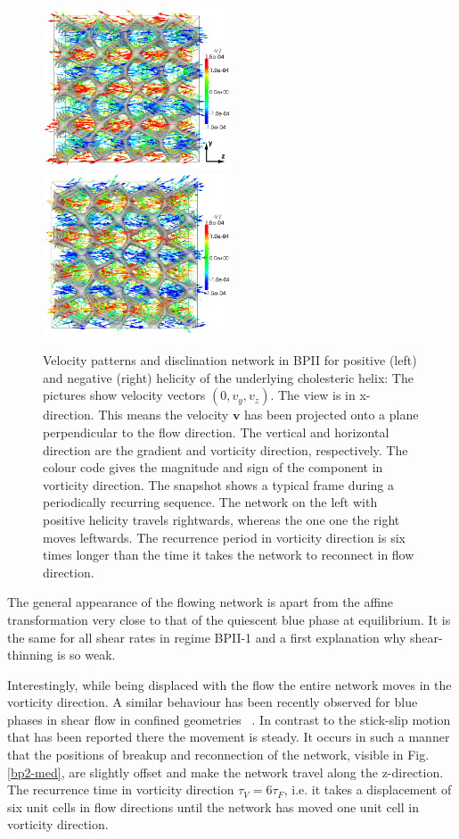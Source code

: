 \documentclass[aps,pre,reprint,superscriptaddress, twocolumn]{revtex4}
\begin{document}
\begin{figure}[htpb]
\includegraphics[width=0.495\textwidth]{v_yz-v_z-160k_run902.png}
\includegraphics[width=0.495\textwidth]{v_yz-v_z-160k_run903.png}
\caption{Velocity patterns and disclination network in BPII for positive (left) and negative (right) helicity of the 
underlying cholesteric helix: The pictures show velocity vectors $(0,v_y,v_z)$.
The view is in x-direction. This means the velocity ${\mathbf v}$ 
has been projected onto a plane perpendicular to the flow direction. 
The vertical and horizontal direction are the gradient and vorticity direction, respectively.
The colour code gives the magnitude and sign of the component in vorticity direction.
The snapshot shows a typical frame during a periodically recurring sequence.
The network on the left with positive helicity travels rightwards, whereas the one one the right
moves leftwards. The recurrence period in vorticity direction is six times longer than the time it takes the network to reconnect in flow direction.}
\label{bp2-velo}
\end{figure}

The general appearance of the flowing network is apart from the affine transformation 
very close to that of the quiescent blue phase at equilibrium. It is the same for 
all shear rates in regime BPII-1 and a first explanation why shear-thinning is so weak.

Interestingly, while being displaced with the flow the entire network moves 
in the vorticity direction.  A similar behaviour has been recently 
observed for blue phases in shear flow in 
confined geometries ~\cite{Henrich:2012b}.
In contrast to the stick-slip motion that has been reported there the movement is 
steady. It occurs in such a manner that the positions of breakup and reconnection 
of the network, visible in Fig. \ref{bp2-med}, are slightly offset and make the network 
travel along the z-direction.
The recurrence time in vorticity direction $\tau_V=6\tau_F$, 
i.e. it takes a displacement of six unit cells in flow directions 
until the network has moved one unit cell in vorticity direction.
\end{document}
